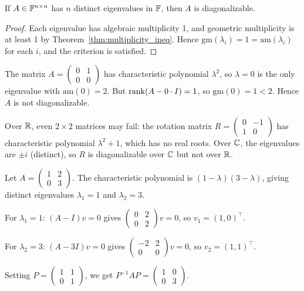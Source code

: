 \documentclass[11pt,a4paper]{article}
\begin{document}
\begin{corollary}
\label{cor:distinct_diag}
If $A \in \mathbb{F}^{n \times n}$ has $n$ distinct eigenvalues in $\mathbb{F}$, then
$A$ is diagonalizable.
\end{corollary}

\begin{proof}
Each eigenvalue has algebraic multiplicity 1, and geometric multiplicity
is at least 1 by Theorem~\ref{thm:multiplicity_ineq}.  Hence
$\mathrm{gm}(\lambda_i) = 1 = \mathrm{am}(\lambda_i)$ for each $i$,
and the criterion is satisfied.
\end{proof}

\begin{warning}[title={Not Every Matrix Is Diagonalizable}]
The matrix $A = \begin{pmatrix} 0 & 1 \\ 0 & 0 \end{pmatrix}$ has
characteristic polynomial $\lambda^2$, so $\lambda = 0$ is the only
eigenvalue with $\mathrm{am}(0) = 2$.  But $\operatorname{rank}(A - 0 \cdot I) = 1$,
so $\mathrm{gm}(0) = 1 < 2$.  Hence $A$ is not diagonalizable.

Over $\mathbb{R}$, even $2 \times 2$ matrices may fail: the rotation matrix
$R = \begin{pmatrix} 0 & -1 \\ 1 & 0 \end{pmatrix}$ has characteristic
polynomial $\lambda^2 + 1$, which has no real roots.  Over $\mathbb{C}$, the
eigenvalues are $\pm i$ (distinct), so $R$ is diagonalizable over $\mathbb{C}$
but not over $\mathbb{R}$.
\end{warning}

\begin{example}
\label{ex:diagonalization}
Let $A = \begin{pmatrix} 1 & 2 \\ 0 & 3 \end{pmatrix}$.  The
characteristic polynomial is $(1 - \lambda)(3 - \lambda)$, giving
distinct eigenvalues $\lambda_1 = 1$ and $\lambda_2 = 3$.

For $\lambda_1 = 1$: $(A - I)v = 0$ gives
$\begin{pmatrix} 0 & 2 \\ 0 & 2 \end{pmatrix}v = 0$, so
$v_1 = (1, 0)^\top$.

For $\lambda_2 = 3$: $(A - 3I)v = 0$ gives
$\begin{pmatrix} -2 & 2 \\ 0 & 0 \end{pmatrix}v = 0$, so
$v_2 = (1, 1)^\top$.

Setting $P = \begin{pmatrix} 1 & 1 \\ 0 & 1 \end{pmatrix}$, we get
$P^{-1}AP = \begin{pmatrix} 1 & 0 \\ 0 & 3 \end{pmatrix}$.
\end{example}
\end{document}
